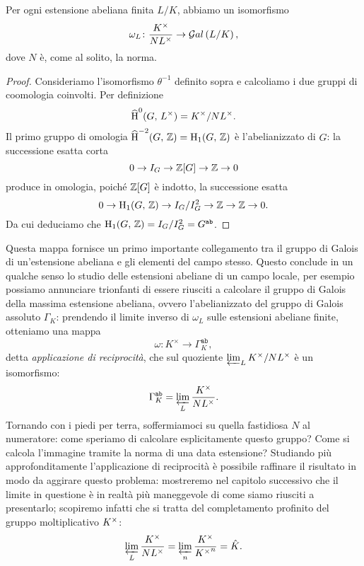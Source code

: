 \begin{theorem}
	Per ogni estensione abeliana finita $ L/K $, abbiamo un isomorfismo
	\[ \omega_L\colon \frac{K^\times}{NL^\times} \to \mathcal{G}al\left( L/K \right), \]
	dove $ N $ è, come al solito, la norma.
\end{theorem}

\begin{proof}
	Consideriamo l'isomorfismo $ \theta^{-1} $ definito sopra e calcoliamo i due gruppi di coomologia coinvolti. Per definizione
	\[ \operatorname{\widehat{H}}^{0}(G, \,  L^\times) = K^\times / NL^\times. \]
	Il primo gruppo di omologia $ \operatorname{\widehat{H}}^{-2}(G, \, \mathbb{Z}) = \operatorname{H}_1(G, \, \mathbb{Z}) $ è l'abelianizzato di $ G $: la successione esatta corta
	\[ 0 \to I_G \to \mathbb{Z}[G] \to \mathbb{Z} \to 0 \]
	produce in omologia, poiché $ \mathbb{Z}[G] $ è indotto, la successione esatta
	\[ 0 \to \operatorname{H}_1(G,\, \mathbb{Z}) \to I_G/I_G^2 \to \mathbb{Z} \to \mathbb{Z} \to 0. \]
	Da cui deduciamo che $ \operatorname{H}_1(G,\, \mathbb{Z}) = I_G/I_G^2 = G^\mathtt{ab} $.
\end{proof}


Questa mappa fornisce un primo importante collegamento tra il gruppo di Galois di un'estensione abeliana e gli elementi del campo stesso. Questo conclude in un qualche senso lo studio delle estensioni abeliane di un campo locale, per esempio possiamo annunciare trionfanti di essere riusciti a calcolare il gruppo di Galois della massima estensione abeliana, ovvero l'abelianizzato del gruppo di Galois assoluto $ \Gamma_K $: prendendo il limite inverso di $ \omega_L $ sulle estensioni abeliane finite, otteniamo una mappa
\[ \omega\colon K^\times \to \Gamma_K^{\texttt{ab}}, \]
detta \emph{applicazione di reciprocità}, che sul quoziente $ \varprojlim_L K^\times / NL^\times  $ è un isomorfismo:
\[ \Gamma_K^{\texttt{ab}} = \varprojlim_L \frac{K^\times}{NL^\times}. \]
Tornando con i piedi per terra, soffermiamoci su quella fastidiosa $ N $ al numeratore: come speriamo di calcolare esplicitamente questo gruppo? Come si calcola l'immagine tramite la norma di una data estensione? Studiando più approfonditamente l'applicazione di reciprocità è possibile raffinare il risultato in modo da aggirare questo problema: mostreremo nel capitolo successivo che il limite in questione è in realtà più maneggevole di come siamo riusciti a presentarlo; scopiremo infatti che si tratta del completamento profinito del gruppo moltiplicativo $ K^\times $:
\[ \varprojlim_L \frac{K^\times}{NL^\times} = \varprojlim_n \frac{K^\times}{{K^\times}^n} = \hat{K}. \]
